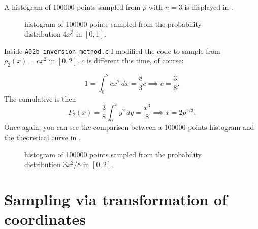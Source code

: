 \documentclass{gulartcl}
\begin{document}


A histogram of \num{100000} points sampled from $\rho$ with $n = 3$ is displayed
in .

\begin{figure}
    \centering
    
    \caption{histogram of \num{100000} points sampled from the probability
        distribution $4 x^3$ in $[0, 1]$.}
    \label{fig:A02a_3}
\end{figure}

Inside \texttt{A02b\_inversion\_method.c} I modified the code to sample from
$\rho_2(x) = cx^2$ in $[0, 2]$. $c$ is different this time, of course:

\begin{equation}
    1 = \int_{0}^{2} cx^2 \, dx = \frac{8}{3}c \implies c = \frac{3}{8}.
\end{equation}
The cumulative is then
\begin{equation}
    F_2(x) = \frac{3}{8} \int_{0}^{x} y^2 \, dy = \frac{x^3}{8} \implies x = 2
    p^{1/3}.
\end{equation}
Once again, you can see the comparison between a \num{100000}-points histogram
and the theoretical curve in .

\begin{figure}
    \centering
    
    \caption{histogram of \num{100000} points sampled from the probability
        distribution $3x^2/8$ in $[0, 2]$.}
    \label{fig:A02b}
\end{figure}

\section{Sampling via transformation of coordinates}
\end{document}
